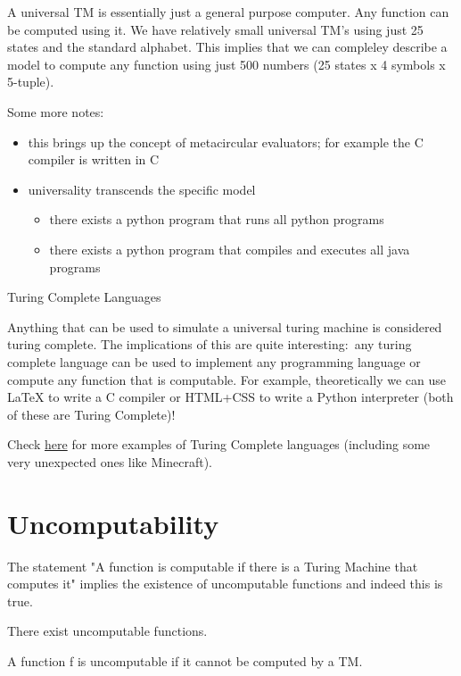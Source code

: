 A universal TM is essentially just a general purpose computer. Any function can be computed using it. We have relatively small universal TM's using just 25 states and the standard alphabet. This implies that we can compleley describe a model to compute any function using just 500 numbers (25 states x 4 symbols x 5-tuple).

Some more notes:
\begin{itemize}
    \item this brings up the concept of metacircular evaluators; for example the C compiler is written in C 
    \item universality transcends the specific model  
    \begin{itemize}
        \item there exists a python program that runs all python programs
        \item there exists a python program that compiles and executes all java programs
    \end{itemize}
\end{itemize}

\begin{definition}
    Turing Complete Languages

    Anything that can be used to simulate a universal turing machine is considered turing complete. The implications of this are quite interesting$:$ any turing complete language can be used to implement any programming language or compute any function that is computable. For example, theoretically we can use \LaTeX{} to write a C compiler or HTML+CSS to write a Python interpreter (both of these are Turing Complete)! 
    
    Check \href{https://en.wikipedia.org/wiki/Turing_completeness#Examples}{here} for more examples of Turing Complete languages (including some very unexpected ones like Minecraft).
\end{definition}

\section{Uncomputability}
The statement "A function is computable if there is a Turing Machine that computes it" implies the existence of uncomputable functions and indeed this is true.

\begin{theorem}
    There exist uncomputable functions.
    
    A function f is uncomputable if it cannot be computed by a TM.
\end{theorem}

